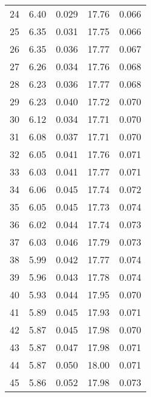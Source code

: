 \begin{table}
\begin{tabular}{c|ll|ll}
24 & 6.40 & 0.029 & 17.76 & 0.066 \\
25 & 6.35 & 0.031 & 17.75 & 0.066 \\
26 & 6.35 & 0.036 & 17.77 & 0.067 \\
27 & 6.26 & 0.034 & 17.76 & 0.068 \\
28 & 6.23 & 0.036 & 17.77 & 0.068 \\
29 & 6.23 & 0.040 & 17.72 & 0.070 \\
30 & 6.12 & 0.034 & 17.71 & 0.070 \\
31 & 6.08 & 0.037 & 17.71 & 0.070 \\
32 & 6.05 & 0.041 & 17.76 & 0.071 \\
33 & 6.03 & 0.041 & 17.77 & 0.071 \\
34 & 6.06 & 0.045 & 17.74 & 0.072 \\
35 & 6.05 & 0.045 & 17.73 & 0.074 \\
36 & 6.02 & 0.044 & 17.74 & 0.073 \\
37 & 6.03 & 0.046 & 17.79 & 0.073 \\
38 & 5.99 & 0.042 & 17.77 & 0.074 \\
39 & 5.96 & 0.043 & 17.78 & 0.074 \\
40 & 5.93 & 0.044 & 17.95 & 0.070 \\
41 & 5.89 & 0.045 & 17.93 & 0.071 \\
42 & 5.87 & 0.045 & 17.98 & 0.070 \\
43 & 5.87 & 0.047 & 17.98 & 0.071 \\
44 & 5.87 & 0.050 & 18.00 & 0.071 \\
45 & 5.86 & 0.052 & 17.98 & 0.073 \\
               \hline
        \end{tabular}
    \end{table}
    \clearpage

